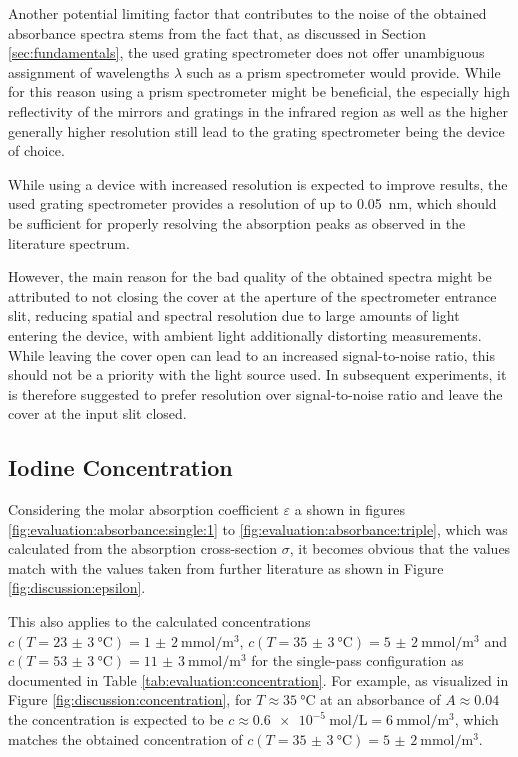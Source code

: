 Another potential limiting factor that contributes to the noise of the obtained absorbance spectra stems from the fact that, as discussed in Section \ref{sec:fundamentals}, the used grating spectrometer does not offer unambiguous assignment of wavelengths $\lambda$ such as a prism spectrometer would provide. While for this reason using a prism spectrometer might be beneficial, the especially high reflectivity of the mirrors and gratings in the infrared region as well as the higher generally higher resolution still lead to the grating spectrometer being the device of choice.

While using a device with increased resolution is expected to improve results, the used grating spectrometer provides a resolution of up to \SI{0.05}{\nm}, which should be sufficient for properly resolving the absorption peaks as observed in the literature spectrum.

However, the main reason for the bad quality of the obtained spectra might be attributed to not closing the cover at the aperture of the spectrometer entrance slit, reducing spatial and spectral resolution due to large amounts of light entering the device, with ambient light additionally distorting measurements. While leaving the cover open can lead to an increased signal-to-noise ratio, this should not be a priority with the light source used. In subsequent experiments, it is therefore suggested to prefer resolution over signal-to-noise ratio and leave the cover at the input slit closed.

\subsection{Iodine Concentration}
\label{sec:discussion:iodine-concentration}

Considering the molar absorption coefficient $\varepsilon$ a shown in figures \ref{fig:evaluation:absorbance:single:1} to \ref{fig:evaluation:absorbance:triple}, which was calculated from the absorption cross-section $\sigma$, it becomes obvious that the values match with the values taken from further literature as shown in Figure \ref{fig:discussion:epsilon}.

This also applies to the calculated concentrations $c(T = \SI{23(3)}{\celsius}) = \SI{1(2)}{\milli\mol\per\m^3}$, $c(T = \SI{35(3)}{\celsius}) = \SI{5(2)}{\milli\mol\per\m^3}$ and $c(T = \SI{53(3)}{\celsius}) = \SI{11(3)}{\milli\mol\per\m^3}$ for the single-pass configuration as documented in Table \ref{tab:evaluation:concentration}. For example, as visualized in Figure \ref{fig:discussion:concentration}, for $T \approx \SI{35}{\celsius}$ at an absorbance of $A \approx 0.04$ the concentration is expected to be $c \approx \SI{0.6e-5}{\mol\per\liter} = \SI{6}{\milli\mol\per\m^3}$, which matches the obtained concentration of $c(T = \SI{35(3)}{\celsius}) = \SI{5(2)}{\milli\mol\per\m^3}$.

